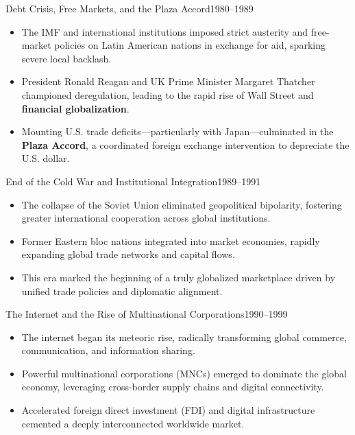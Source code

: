 \documentclass[10pt, aspectratio=169]{beamer}
\begin{document}
	\begin{frame}{Debt Crisis, Free Markets, and the Plaza Accord}{1980--1989}
		\begin{itemize}
			\item The IMF and international institutions imposed strict austerity and free-market policies on Latin American nations in exchange for aid, sparking severe local backlash.
			\vspace{0.25cm}
			\item President Ronald Reagan and UK Prime Minister Margaret Thatcher championed deregulation, leading to the rapid rise of Wall Street and \textbf{financial globalization}.
			\vspace{0.25cm}
			\item Mounting U.S. trade deficits—particularly with Japan—culminated in the \textbf{Plaza Accord}, a coordinated foreign exchange intervention to depreciate the U.S. dollar.
		\end{itemize}
	\end{frame}
	
	\begin{frame}{End of the Cold War and Institutional Integration}{1989--1991}
		\begin{itemize}
			\item The collapse of the Soviet Union eliminated geopolitical bipolarity, fostering greater international cooperation across global institutions.
			\vspace{0.25cm}
			\item Former Eastern bloc nations integrated into market economies, rapidly expanding global trade networks and capital flows.
			\vspace{0.25cm}
			\item This era marked the beginning of a truly globalized marketplace driven by unified trade policies and diplomatic alignment.
		\end{itemize}
	\end{frame}
	
	\begin{frame}{The Internet and the Rise of Multinational Corporations}{1990--1999}
		\begin{itemize}
			\item The internet began its meteoric rise, radically transforming global commerce, communication, and information sharing.
			\vspace{0.25cm}
			\item Powerful multinational corporations (MNCs) emerged to dominate the global economy, leveraging cross-border supply chains and digital connectivity.
			\vspace{0.25cm}
			\item Accelerated foreign direct investment (FDI) and digital infrastructure cemented a deeply interconnected worldwide market.
		\end{itemize}
	\end{frame}
	
\end{document}
